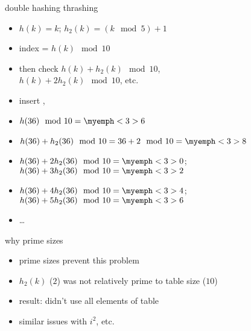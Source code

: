 \begin{frame}{double hashing thrashing}
\begin{itemize}
\item $h(k) = k$; $h_2(k) = (k \mod 5) + 1$
\item index = $h(k) \mod 10$
\item then check $h(k) + h_2(k) \mod 10$, \\ $h(k) + 2h_2(k) \mod 10$, etc.
\item insert , 
\item<3-> $h(36) \mod 10 = \myemph<3>{6}$
\item<3-> $h(36) + h_2(36) \mod 10 = 36 + 2 \mod 10 = \myemph<3>{8}$
\item<3-> $h(36) + 2h_2(36) \mod 10 = \myemph<3>{0}$; $h(36) + 3h_2(36) \mod 10 = \myemph<3>{2}$
\item<3-> $h(36) + 4h_2(36) \mod 10 = \myemph<3>{4}$; $h(36) + 5h_2(36) \mod 10 = \myemph<3>{6}$
\item<3-> \ldots
\end{itemize}
\end{frame}

\begin{frame}{why prime sizes}
\begin{itemize}
\item prime sizes prevent this problem
\item $h_2(k)$ ($2$) was not relatively prime to table size ($10$) 
\item result: didn't use all elements of table
\vspace{.5cm}
\item similar issues with $i^2$, etc.
\end{itemize}
\end{frame}
